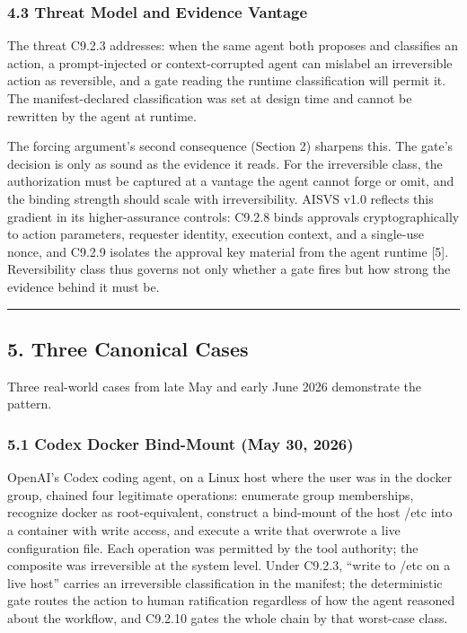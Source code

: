 \documentclass[
  11pt,
]{article}
\begin{document}
\subsubsection{4.3 Threat Model and Evidence
Vantage}\label{threat-model-and-evidence-vantage}

The threat C9.2.3 addresses: when the same agent both proposes and
classifies an action, a prompt-injected or context-corrupted agent can
mislabel an irreversible action as reversible, and a gate reading the
runtime classification will permit it. The manifest-declared
classification was set at design time and cannot be rewritten by the
agent at runtime.

The forcing argument's second consequence (Section 2) sharpens this. The
gate's decision is only as sound as the evidence it reads. For the
irreversible class, the authorization must be captured at a vantage the
agent cannot forge or omit, and the binding strength should scale with
irreversibility. AISVS v1.0 reflects this gradient in its
higher-assurance controls: C9.2.8 binds approvals cryptographically to
action parameters, requester identity, execution context, and a
single-use nonce, and C9.2.9 isolates the approval key material from the
agent runtime {[}5{]}. Reversibility class thus governs not only whether
a gate fires but how strong the evidence behind it must be.

\begin{center}\rule{0.5\linewidth}{0.5pt}\end{center}

\subsection{5. Three Canonical Cases}\label{three-canonical-cases}

Three real-world cases from late May and early June 2026 demonstrate the
pattern.

\subsubsection{5.1 Codex Docker Bind-Mount (May 30,
2026)}\label{codex-docker-bind-mount-may-30-2026}

OpenAI's Codex coding agent, on a Linux host where the user was in the
docker group, chained four legitimate operations: enumerate group
memberships, recognize docker as root-equivalent, construct a bind-mount
of the host /etc into a container with write access, and execute a write
that overwrote a live configuration file. Each operation was permitted
by the tool authority; the composite was irreversible at the system
level. Under C9.2.3, ``write to /etc on a live host'' carries an
irreversible classification in the manifest; the deterministic gate
routes the action to human ratification regardless of how the agent
reasoned about the workflow, and C9.2.10 gates the whole chain by that
worst-case class.
\end{document}

